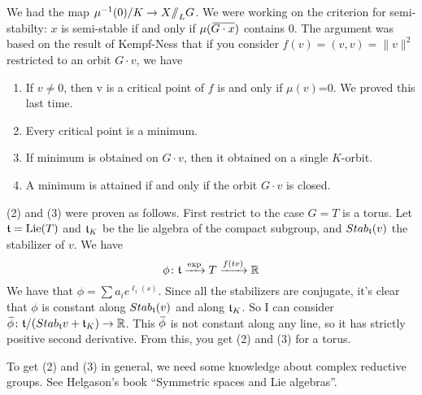 
We had the map $\mu^{-1}(0)/K\to X\mbox{\rm /\!\!/}_LG$. We were working on the criterion for semi-stabilty: $x$ is semi-stable if and only if $\mu(\bbar{G\cdot x})$ contains 0. The argument was based on the result of Kempf-Ness that if you consider $f(v)=(v,v)=\|v\|^2$ restricted to an orbit $G\cdot v$, we have
\begin{enumerate}
 \item If $v\neq 0$, then v is a critical point of $f$ is and only if $\mu(v)$=0. We proved this last time.
 \item Every critical point is a minimum.
 \item If minimum is obtained on $G\cdot v$, then it obtained on a single $K$-orbit.
 \item A minimum is attained if and only if the orbit $G\cdot v$ is closed.
\end{enumerate}
(2) and (3) were proven as follows. First restrict to the case $G=T$ is a torus. Let $\mathfrak{t}=\operatorname{Lie}(T)$ and $\mathfrak{t}_K$ be the lie algebra of the compact subgroup, and $Stab_{\mathfrak{t}}(v)$ the stabilizer of $v$. We have
\[
 \phi\colon \mathfrak{t}\xrightarrow\exp T\xrightarrow{f(tv)}\mathbb{R}
\]
We have that $\phi=\sum a_i e^{\ell_i(s)}$. Since all the stabilizers are conjugate, it's clear that $\phi$ is constant along $Stab_{\mathfrak{t}}(v)$ and along $\mathfrak{t}_K$. So I can consider $\bbar\phi\colon \t/(Stab_\t v + \t_K)\to \RR$. This $\bbar\phi$ is not constant along any line, so it has strictly positive second derivative. From this, you get (2) and (3) for a torus.

To get (2) and (3) in general, we need some knowledge about complex reductive groups. See Helgason's book ``Symmetric spaces and Lie algebras''.

